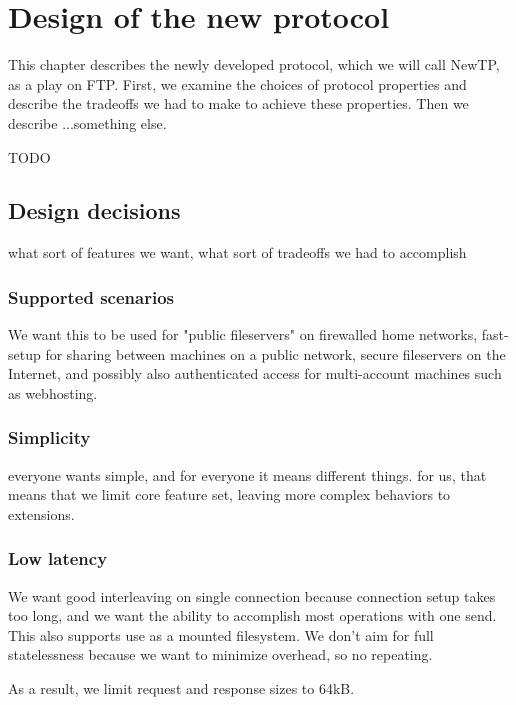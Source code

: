 
\chapter{Design of the new protocol}

This chapter describes the newly developed protocol, which we will call NewTP, as a play on FTP. First, we
examine the choices of protocol properties and describe the tradeoffs we had to make to achieve these
properties. Then we describe ...something else.

TODO

\section{Design decisions}

what sort of features we want, what sort of tradeoffs we had to accomplish

\subsection{Supported scenarios}

We want this to be used for "public fileservers" on firewalled home networks, fast-setup for sharing between
machines on a public network, secure fileservers on the Internet, and possibly also authenticated access for
multi-account machines such as webhosting.

\subsection{Simplicity}

everyone wants simple, and for everyone it means different things. for us, that means that we limit core
feature set, leaving more complex behaviors to extensions.

\subsection{Low latency}

We want good interleaving on single connection because connection setup takes too long, and we want the
ability to accomplish most operations with one send. This also supports use as a mounted filesystem. We don't
aim for full statelessness because we want to minimize overhead, so no repeating.

As a result, we limit request and response sizes to 64kB.

